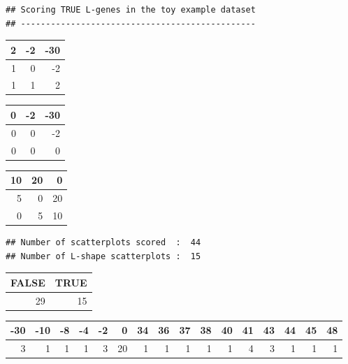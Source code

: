 \documentclass[a4paper,10pt]{article}\usepackage[]{graphicx}\usepackage[]{color}
\makeatletter
\newenvironment{kframe}{%
 \def\at@end@of@kframe{}%
 \ifinner\ifhmode%
  \def\at@end@of@kframe{\end{minipage}}%
  \begin{minipage}{\columnwidth}%
 \fi\fi%
 \def\FrameCommand##1{\hskip\@totalleftmargin \hskip-\fboxsep
 \colorbox{shadecolor}{##1}\hskip-\fboxsep
     \hskip-\linewidth \hskip-\@totalleftmargin \hskip\columnwidth}%
 \MakeFramed {\advance\hsize-\width
   \@totalleftmargin\z@ \linewidth\hsize
   \@setminipage}}%
 {\par\unskip\endMakeFramed%
 \at@end@of@kframe}
\newenvironment{knitrout}{}{} %
\makeatother
\begin{document}
\begin{knitrout}
\color{fgcolor}\begin{kframe}
\begin{verbatim}
## Scoring TRUE L-genes in the toy example dataset 
## -----------------------------------------------
\end{verbatim}
\end{kframe}


\begin{tabular}{r|r|r}
\hline
2 & -2 & -30\\
\hline
1 & 0 & -2\\
\hline
1 & 1 & 2\\
\hline
\end{tabular}


\begin{tabular}{r|r|r}
\hline
0 & -2 & -30\\
\hline
0 & 0 & -2\\
\hline
0 & 0 & 0\\
\hline
\end{tabular}


\begin{tabular}{r|r|r}
\hline
10 & 20 & 0\\
\hline
5 & 0 & 20\\
\hline
0 & 5 & 10\\
\hline
\end{tabular}\begin{kframe}\begin{verbatim}
## Number of scatterplots scored  :  44
## Number of L-shape scatterplots :  15
\end{verbatim}
\end{kframe}


\begin{tabular}{r|r}
\hline
FALSE & TRUE\\
\hline
29 & 15\\
\hline
\end{tabular}


\begin{tabular}{r|r|r|r|r|r|r|r|r|r|r|r|r|r|r|r}
\hline
-30 & -10 & -8 & -4 & -2 & 0 & 34 & 36 & 37 & 38 & 40 & 41 & 43 & 44 & 45 & 48\\
\hline
3 & 1 & 1 & 1 & 3 & 20 & 1 & 1 & 1 & 1 & 1 & 4 & 3 & 1 & 1 & 1\\
\hline
\end{tabular}
\end{knitrout}
\end{document}
